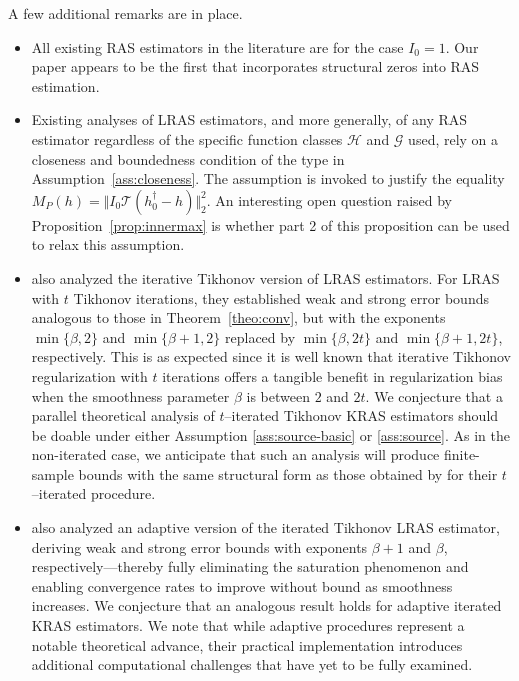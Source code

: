 \documentclass[twoside,11pt]{article}
\newcommand{\mc}{\mathcal}
\begin{document}
A few additional remarks are in place.
\begin{itemize}
\item All existing RAS estimators in the literature are for the case $I_0=1$. Our paper appears to be the first that incorporates structural zeros into RAS estimation.
\item Existing analyses of LRAS estimators, and more generally, of any RAS estimator regardless of the specific function classes $\mc{H}$ and $\mc{G}$ used, rely on a closeness and boundedness condition of the type in Assumption~\ref{ass:closeness}. The assumption is invoked to justify the equality $M_P(h) =\Vert I_0\mc{T}(h_0^\dag-h)\Vert_2^2$. An interesting open question raised by Proposition~\ref{prop:innermax} is whether part 2 of this proposition can be used to relax this assumption.  
\item \citet{bennett2023source} also analyzed the iterative Tikhonov version of LRAS estimators. For LRAS with $t$ Tikhonov iterations, they established weak and strong error bounds analogous to those in Theorem~\ref{theo:conv}, but with the exponents $\min\{\beta, 2\}$ and $\min\{\beta + 1, 2\}$ replaced by $\min\{\beta, 2t\}$ and $\min\{\beta + 1, 2t\}$, respectively. This is as expected since it is well known that iterative Tikhonov regularization with $t$ iterations offers a tangible benefit in regularization bias when the smoothness parameter $\beta$ is between $2$ and $2t$. We conjecture that a parallel theoretical analysis of $t$--iterated Tikhonov KRAS estimators should be doable under either Assumption \ref{ass:source-basic} or \ref{ass:source}. As in the non-iterated case, we anticipate that such an analysis will produce finite-sample bounds with the same structural form as those obtained by \citet{bennett2023source} for their $t$--iterated procedure. 

\item \citet{bennett2023source} also analyzed an adaptive version of the iterated Tikhonov LRAS estimator, deriving weak and strong error bounds with exponents $\beta+1$ and $\beta$, respectively---thereby fully eliminating the saturation phenomenon and enabling convergence rates to improve without bound as smoothness increases. We conjecture that an analogous result holds for adaptive iterated KRAS estimators. We note that while adaptive procedures represent a notable theoretical advance, their practical implementation introduces additional computational challenges that have yet to be fully examined.


\end{itemize}
\end{document}
